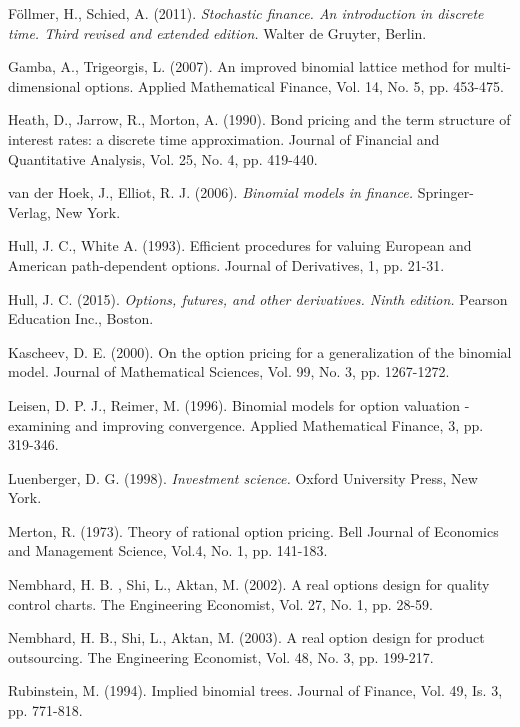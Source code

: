 \documentclass{amsart}
\theoremstyle{definition}
\theoremstyle{remark}
\numberwithin{equation}{section}
\newcommand{\1}{\boldsymbol{1}}
\begin{document}
\begin{thebibliography}{DGZ}
 F{\"o}llmer, H., Schied, A. (2011). \emph{Stochastic finance. An introduction in discrete time. Third revised and extended edition.} Walter de Gruyter, Berlin.

 Gamba, A., Trigeorgis, L. (2007). An improved binomial lattice method for multi-dimensional options. Applied Mathematical Finance, Vol. 14, No. 5, pp. 453-475.

 Heath, D., Jarrow, R., Morton, A. (1990). Bond pricing and the term structure of interest rates: a discrete time approximation. Journal of Financial and Quantitative Analysis, Vol. 25, No. 4, pp. 419-440.

 van der Hoek, J., Elliot, R. J. (2006).\emph{ Binomial models in finance.} Springer-Verlag, New York.

 Hull, J. C., White A. (1993). Efficient procedures for valuing European and American path-dependent options. Journal of Derivatives, 1, pp. 21-31.

 Hull, J. C. (2015). \emph{Options, futures, and other derivatives. Ninth edition.} Pearson Education Inc., Boston.

 Kascheev, D. E. (2000). On the option pricing for a generalization of the binomial model. Journal of Mathematical Sciences, Vol. 99, No. 3, pp. 1267-1272.

 Leisen, D. P. J., Reimer, M. (1996). Binomial models for option valuation - examining and improving convergence. Applied Mathematical Finance, 3, pp. 319-346.

 Luenberger, D. G. (1998). \emph{Investment science.} Oxford University Press, New York.

 Merton, R. (1973). Theory of rational option pricing. Bell Journal of Economics and Management Science, Vol.4, No. 1, pp. 141-183.

 Nembhard, H. B. , Shi, L., Aktan, M. (2002). A real options design for quality control charts. The Engineering Economist, Vol. 27, No. 1, pp. 28-59.

 Nembhard, H. B., Shi, L., Aktan, M. (2003). A real option design for product outsourcing. The Engineering Economist, Vol. 48, No. 3, pp. 199-217.

 Rubinstein, M. (1994). Implied binomial trees. Journal of Finance, Vol. 49, Is. 3, pp. 771-818.



\end{thebibliography}
\end{document}

